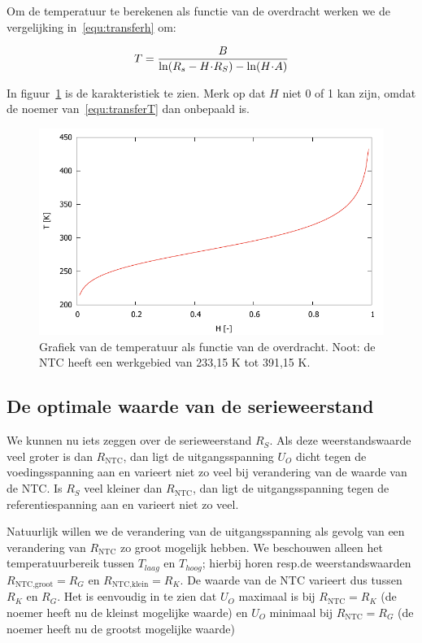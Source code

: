 \documentclass[12pt,a4paper,final,twoside,fleqn]{article}
\newcommand{\rntc}{R_\text{NTC}}
\let\oldcdot\cdot
\renewcommand{\cdot}{\kern-.10em\oldcdot\kern-.10em}
\begin{document}
Om de temperatuur te berekenen als functie van de overdracht werken we de
vergelijking in~\eqref{equ:transferh} om:

\begin{equation}
\label{equ:transferT}
T = \dfrac{B}{\ln (R_s - H\cdot R_S) - \ln (H\cdot A)}
\end{equation}

In figuur~\ref{fig:transferfunctionT} is de karakteristiek te zien. Merk op
dat $H$ niet 0 of 1 kan zijn, omdat de noemer van~\eqref{equ:transferT} dan
onbepaald is.

\begin{figure}[ht!]
\centering
\includegraphics[scale=1]{gnuplot/transferfunctionT}
\caption[Grafiek van de temperatuur als functie van de overdracht]{Grafiek van de temperatuur als functie van de overdracht. Noot:
de NTC heeft een werkgebied van 233,15 K tot 391,15 K.}
\label{fig:transferfunctionT}
\end{figure}





\subsection{De optimale waarde van de serieweerstand}
We kunnen nu iets zeggen over de serieweerstand $R_S$. Als deze weerstandswaarde
veel groter is dan $\rntc$, dan ligt de uitgangsspanning $U_O$ dicht tegen de
voedingsspanning aan en varieert niet zo veel bij verandering van de waarde van
de NTC. Is $R_S$ veel kleiner dan $\rntc$, dan ligt de uitgangsspanning tegen
de referentiespanning aan en varieert niet zo veel.

Natuurlijk willen we de verandering van de uitgangsspanning als gevolg van een
verandering van $\rntc$ zo groot mogelijk hebben. We beschouwen alleen het
temperatuurbereik tussen $T_{laag}$ en $T_{hoog}$; hierbij horen resp.\@ de
weerstandswaarden $R_\text{NTC,groot} = R_G$ en $R_\text{NTC,klein} = R_K$.
De waarde van de NTC varieert dus tussen $R_K$ en $R_G$. Het is eenvoudig in
te zien dat $U_O$ maximaal is bij $\rntc = R_K$ (de noemer heeft nu de kleinst
mogelijke waarde) en $U_O$ minimaal bij $\rntc = R_G$ (de noemer heeft nu de
grootst mogelijke waarde)
\end{document}
